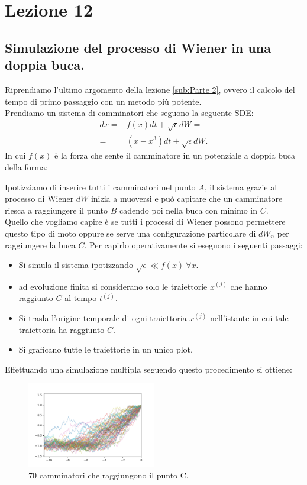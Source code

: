\section{Lezione 12}%
\label{sub:Lezione 12}
\subsection{Simulazione del processo di Wiener in una doppia buca.}%
\label{sub:Simulazione dei camminatori.}
Riprendiamo l'ultimo argomento della lezione \ref{sub:Parte 2}, ovvero il calcolo del tempo di primo passaggio con un metodo più potente. \\
Prendiamo un sistema di camminatori che seguono la seguente SDE:
\[\begin{aligned}
    dx = & f(x) dt + \sqrt{\epsilon} dW = \\
    = & \left(x-x^3\right)dt + \sqrt{\epsilon} dW
.\end{aligned}\]
In cui $f(x)$ è la forza che sente il camminatore in un potenziale a doppia buca della forma:

\noindent
Ipotizziamo di inserire tutti i camminatori nel punto $A$, il sistema grazie al processo di Wiener $dW$ inizia a muoversi e può capitare che un camminatore riesca a raggiungere il punto $B$ cadendo poi nella buca con minimo in $C$. \\
Quello che vogliamo capire è se tutti i processi di Wiener possono permettere questo tipo di moto oppure se serve una configurazione particolare di $dW_n$ per raggiungere la buca $C$. Per capirlo operativamente si eseguono i seguenti passaggi:
\begin{itemize}
    \item Si simula il sistema ipotizzando $\sqrt{\epsilon} \ll f(x) \ \forall x$.
    \item ad evoluzione finita si considerano solo le traiettorie $x^{(j)}$ che hanno raggiunto $C$ al tempo $t^{(j)}$.
    \item Si trasla l'origine temporale di ogni traiettoria $x^{(j)}$ nell'istante in cui tale traiettoria ha raggiunto $C$.
    \item Si graficano tutte le traiettorie in un unico plot.
\end{itemize}
Effettuando una simulazione multipla seguendo questo procedimento si ottiene:
\begin{figure}[H]
    \centering
    \includegraphics[width=0.5\textwidth]{figures/lez_12_walker_t_path.png}
    \caption{\scriptsize 70 camminatori che raggiungono il punto C.}
    \label{fig:figures-lez_12_walker_t_path-png}
\end{figure}

